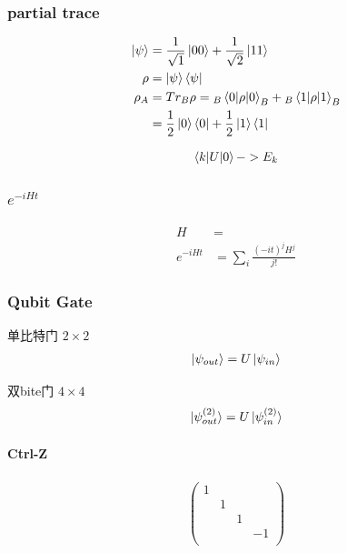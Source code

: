 \subsubsection{partial trace}
\begin{align*}
    \ket{\psi}&=\frac{1}{\sqrt{1}}\ket{00}+\frac{1}{\sqrt{2}}\ket{11}\\
    \rho&=\ket{\psi}\bra{\psi}\\
    \rho_A&=Tr_B\rho={}_B\braket{0|\rho|0}_B+{}_B\braket{1|\rho|1}_B\\
    &=\frac{1}{2}\ket{0}\bra{0}+\frac{1}{2}\ket{1}\bra{1}
\end{align*}


\begin{align*}
    \braket{k|U|0}->E_k
\end{align*}

\subsubsection{\texorpdfstring{$e^{-iHt}$}.}
\begin{align*}
    H&=\\
    e^{-iHt}&=\sum_i\frac{(-it)^jH^j}{j!}
\end{align*}




\subsubsection{Qubit Gate}
单比特门 $2\times 2$
\begin{align*}
    \ket{\psi_{out}}=U\ket{\psi_{in}}
\end{align*}

双bite门 $4\times 4$
\begin{align*}
    \ket{\psi_{out}^{(2)}}=U\ket{\psi_{in}^{(2)}}
\end{align*}

\paragraph{Ctrl-Z}

\begin{align*}
    \begin{pmatrix}
        1 & & &\\
        &1& &\\
        & &1&\\
        & & &-1\\
    \end{pmatrix}
\end{align*}


